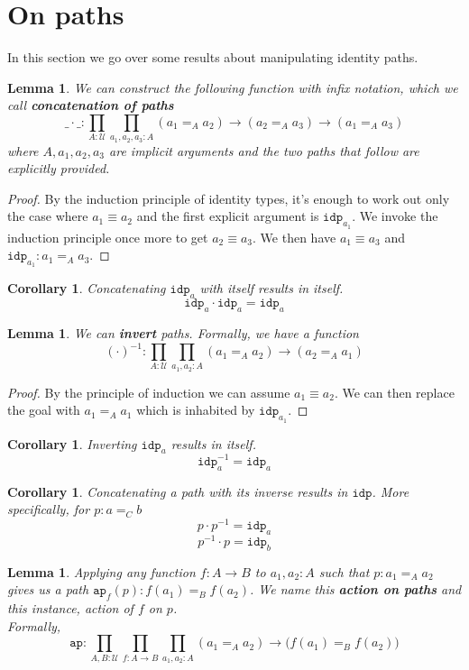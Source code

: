 \documentclass[12pt]{report}
\newtheorem{lem}[thm]{Lemma}
\newtheorem{cor}[thm]{Corollary}
\theoremstyle{definition}
\begin{document}
	\section{On paths}
	In this section we go over some results about manipulating identity paths. 
	\begin{lem}
	We can construct the following function with infix notation, which we call \textbf{concatenation of paths}
	$$\_\cdot \_ : \prod_{A : \mathcal{U}}\prod_{a_1, a_2, a_3 : A}(a_1 =_A a_2) \rightarrow (a_2 =_A a_3) \rightarrow (a_1 =_A a_3)$$
	where $A, a_1, a_2, a_3$ are implicit arguments and the two paths that follow are explicitly provided. 
	\end{lem}
	\begin{proof}
	By the induction principle of identity types, it's enough to work out only the case where $a_1 \equiv a_2$ and the first explicit argument is $\mathtt{idp}_{a_1}$. 
	We invoke the induction principle once more to get $a_2 \equiv a_3$. 
	We then have $a_1 \equiv a_3$ and $\mathtt{idp}_{a_1} : a_1 =_A a_3$. 
	\end{proof}
	\begin{cor}
	Concatenating $\mathtt{idp}_a$ with itself results in itself. 
	$$\mathtt{idp}_a \cdot \mathtt{idp}_a = \mathtt{idp}_a$$
	\end{cor}
	\begin{lem}
	We can \textbf{invert} paths. 
	Formally, we have a function
	$$(\cdot)^{-1} : \prod_{A : \mathcal{U}}\prod_{a_1, a_2 : A}(a_1 =_A a_2) \rightarrow (a_2 =_A a_1)$$
	\end{lem}
	\begin{proof}
	By the principle of induction we can assume $a_1 \equiv a_2$. 
	We can then replace the goal with $a_1 =_A a_1$ which is inhabited by $\mathtt{idp}_{a_1}$. 
	\end{proof}
	\begin{cor}
	Inverting $\mathtt{idp}_a$ results in itself. 
	$$\mathtt{idp}_a^{-1} = \mathtt{idp}_a$$
	\end{cor}
	\begin{cor}
	Concatenating a path with its inverse results in $\mathtt{idp}$. 
	More specifically, for $p : a =_C b$
	$$p \cdot p^{-1} = \mathtt{idp}_a$$
	$$p^{-1} \cdot p = \mathtt{idp}_b$$
	\end{cor}
	\begin{lem}
	Applying any function $f : A\rightarrow B$ to $a_1, a_2 : A$ such that $p : a_1 =_A a_2$ gives us a path $\mathtt{ap}_f (p) : f(a_1) =_B f(a_2)$. 
	We name this \textbf{action on paths} and this instance, action of $f$ on $p$.\\
	Formally,
	$$\mathtt{ap} : \prod_{A,B : \mathcal{U}}\prod_{f : A \rightarrow B}\prod_{a_1,a_2 : A}(a_1 =_A a_2)\rightarrow \big(f(a_1) =_B f(a_2)\big)$$
	\end{lem}
\end{document}
